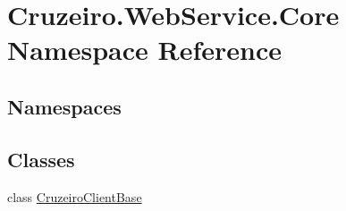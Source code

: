 \hypertarget{namespace_cruzeiro_1_1_web_service_1_1_core}{}\section{Cruzeiro.\+Web\+Service.\+Core Namespace Reference}
\label{namespace_cruzeiro_1_1_web_service_1_1_core}
\subsection*{Namespaces}
\begin{DoxyCompactItemize}
\end{DoxyCompactItemize}
\subsection*{Classes}
\begin{DoxyCompactItemize}
\item 
class \hyperlink{class_cruzeiro_1_1_web_service_1_1_core_1_1_cruzeiro_client_base}{Cruzeiro\+Client\+Base}
\end{DoxyCompactItemize}
